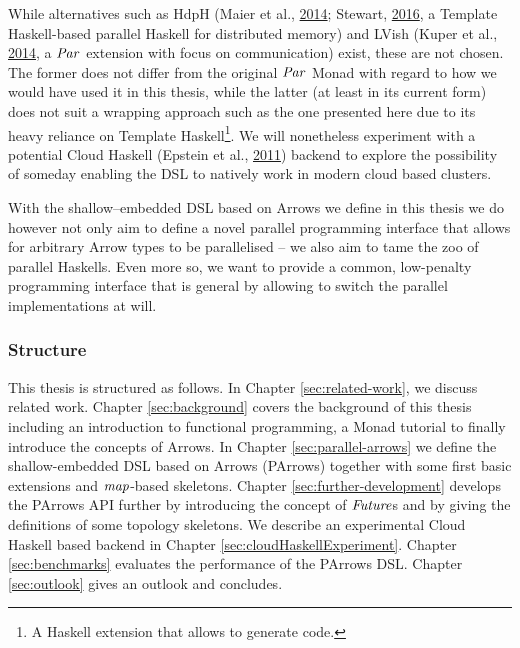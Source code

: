 \documentclass[paper=A4,twoside=true,openright,parskip=full,chapterprefix=true,headings=normal,bibliography=totoc,listof=totoc,titlepage=on,captions=tableabove,draft=false,british]{scrreprt}%
\begin{document}
While alternatives such as HdpH (Maier et al.,
\protect\hyperlink{ref-Maier:2014:HDS:2775050.2633363}{2014}; Stewart,
\protect\hyperlink{ref-stewart_maier_trinder_2016}{2016}, a Template
Haskell-based parallel Haskell for distributed memory) and LVish (Kuper
et al., \protect\hyperlink{ref-Kuper:2014:TPE:2666356.2594312}{2014}, a
\ensuremath{\Conid{Par}} extension with focus on communication) exist, these are not
chosen. The former does not differ from the original \ensuremath{\Conid{Par}} Monad with
regard to how we would have used it in this thesis, while the latter (at
least in its current form) does not suit a wrapping approach such as the
one presented here due to its heavy reliance on Template
Haskell\footnote{A Haskell extension that allows to generate code.}. We
will nonetheless experiment with a potential Cloud Haskell (Epstein et
al., \protect\hyperlink{ref-Epstein:2011:THC:2096148.2034690}{2011})
backend to explore the possibility of someday enabling the DSL to
natively work in modern cloud based clusters.

With the shallow--embedded DSL based on Arrows we define in this thesis
we do however not only aim to define a novel parallel programming
interface that allows for arbitrary Arrow types to be parallelised -- we
also aim to tame the zoo of parallel Haskells. Even more so, we want to
provide a common, low-penalty programming interface that is general by
allowing to switch the parallel implementations at will.

\hypertarget{structure}{%
\subsubsection{Structure}\label{structure}}

This thesis is structured as follows. In Chapter \ref{sec:related-work},
we discuss related work. Chapter \ref{sec:background} covers the
background of this thesis including an introduction to functional
programming, a Monad tutorial to finally introduce the concepts of
Arrows. In Chapter \ref{sec:parallel-arrows} we define the
shallow-embedded DSL based on Arrows (PArrows) together with some first
basic extensions and \ensuremath{\Varid{map}}-based skeletons. Chapter
\ref{sec:further-development} develops the PArrows API further by
introducing the concept of \ensuremath{\Conid{Future}}s and by giving the definitions of
some topology skeletons. We describe an experimental Cloud Haskell based
backend in Chapter \ref{sec:cloudHaskellExperiment}. Chapter
\ref{sec:benchmarks} evaluates the performance of the PArrows DSL.
Chapter \ref{sec:outlook} gives an outlook and concludes.
\end{document}

